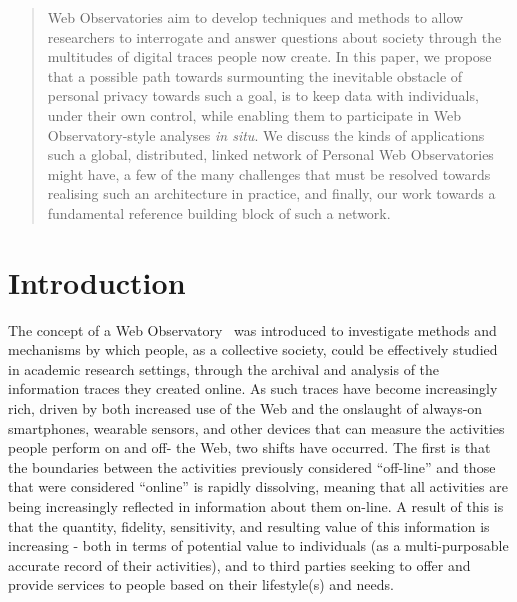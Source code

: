 \documentclass{acm_proc_article-sp}
\begin{document}


\maketitle
\begin{abstract}
Web Observatories aim to develop techniques and methods to allow researchers to interrogate and answer questions about society through the multitudes of digital traces people now create.  In this paper, we propose that a possible path towards surmounting the inevitable obstacle of personal privacy towards such a goal, is to keep data with individuals, under their own control, while enabling them to participate in Web Observatory-style analyses \emph{in situ}.  We discuss the kinds of applications such a global, distributed, linked network of Personal Web Observatories might have, a few of the many challenges that must be resolved towards realising such an architecture in practice, and finally, our work towards a fundamental reference building block of such a network.
\end{abstract}


\section{Introduction}

The concept of a Web Observatory~\cite{Tiropanis2013,Hall2014} was introduced to investigate methods and mechanisms by which people, as a collective society, could be effectively studied in academic research settings, through the archival and analysis of the information traces they created online. As such traces have become increasingly rich, driven by both increased use of the Web and the onslaught of always-on smartphones, wearable sensors, and other devices that can measure the activities people perform on and off- the Web, two shifts have occurred. The first is that the boundaries between the activities previously considered ``off-line'' and those that were considered ``online'' is rapidly dissolving, meaning that all activities are being increasingly reflected in information about them on-line. A result of this is that the quantity, fidelity, sensitivity, and resulting value of this information is increasing - both in terms of potential value to individuals (as a multi-purposable accurate record of their activities), and to third parties seeking to offer and provide services to people based on their lifestyle(s) and needs. 
\end{document}
